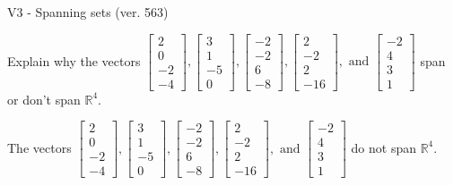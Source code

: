 \begin{exercise}
  \begin{exerciseTitle}V3 - Spanning sets (ver. 563)\end{exerciseTitle}
  \begin{exerciseStatement}
    Explain why the vectors \(\left[\begin{array}{r}
2 \\
0 \\
-2 \\
-4
\end{array}\right] , \left[\begin{array}{r}
3 \\
1 \\
-5 \\
0
\end{array}\right] , \left[\begin{array}{r}
-2 \\
-2 \\
6 \\
-8
\end{array}\right] , \left[\begin{array}{r}
2 \\
-2 \\
2 \\
-16
\end{array}\right] , \text{ and } \left[\begin{array}{r}
-2 \\
4 \\
3 \\
1
\end{array}\right]\) span or don't span \(\mathbb{R}^4\). 
	


  \end{exerciseStatement}
  \begin{exerciseAnswer}
   The vectors \(\left[\begin{array}{r}
2 \\
0 \\
-2 \\
-4
\end{array}\right] , \left[\begin{array}{r}
3 \\
1 \\
-5 \\
0
\end{array}\right] , \left[\begin{array}{r}
-2 \\
-2 \\
6 \\
-8
\end{array}\right] , \left[\begin{array}{r}
2 \\
-2 \\
2 \\
-16
\end{array}\right] , \text{ and } \left[\begin{array}{r}
-2 \\
4 \\
3 \\
1
\end{array}\right]\) 
  	 do not  
	span \(\mathbb{R}^4\).
  



\end{exerciseAnswer}
\end{exercise}
